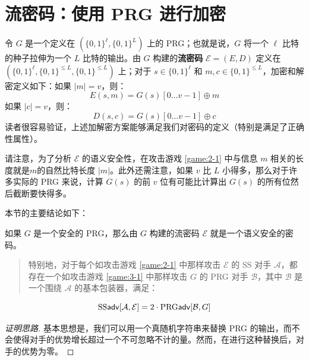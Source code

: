 \section{流密码：使用 PRG 进行加密}\label{sec:3-2}

令 $G$ 是一个定义在 $(\{0,1\}^\ell,\{0,1\}^L)$ 上的 PRG；也就是说，$G$ 将一个 $\ell$ 比特的种子拉伸为一个 $L$ 比特的输出。由 $G$ 构建的\textbf{流密码} $\mathcal E=(E,D)$ 定义在 $(\{0,1\}^\ell,\{0,1\}^{\leq L},\{0,1\}^{\leq L})$ 上；对于 $s\in\{0,1\}^\ell$ 和 $m,c\in\{0,1\}^{\leq L}$，加密和解密定义如下：如果 $|m|=v$，则：
$$
E(s,m)=G(s)[0\dots v-1]\oplus m
$$
如果 $|c| = v$，则：
$$
D(s,c)=G(s)[0\dots v-1]\oplus c
$$
读者很容易验证，上述加解密方案能够满足我们对密码的定义（特别是满足了正确性属性）。

请注意，为了分析 $\mathcal E$ 的语义安全性，在攻击游戏 \ref{game:2-1} 中与信息 $m$ 相关的长度就是$m$的自然比特长度 $|m|$。此外还需注意，如果 $v$ 比 $L$ 小得多，那么对于许多实际的 PRG 来说，计算 $G(s)$ 的前 $v$ 位有可能比计算出 $G(s)$ 的所有位然后截断要快得多。

本节的主要结论如下：

\begin{theorem}\label{theo:3-1}
如果 $G$ 是一个安全的 PRG，那么由 $G$ 构建的流密码 $\mathcal E$ 就是一个语义安全的密码。
\begin{quote}
特别地，对于每个如攻击游戏 \ref{game:2-1} 中那样攻击 $\mathcal E$ 的 SS 对手 $\mathcal A$，都存在一个如攻击游戏 \ref{game:3-1} 中那样攻击 $G$ 的 PRG 对手 $\mathcal B$，其中 $\mathcal B$ 是一个围绕 $\mathcal A$ 的基本包装器，满足：
\end{quote}
\begin{equation}\label{eq:3-2}
{\rm SS\mathsf{adv}}[\mathcal{A},\mathcal{E}]=2\cdot{\rm PRG\mathsf{adv}}[\mathcal{B},G]
\end{equation}
\end{theorem}

\begin{proof}[证明思路]
基本思想是，我们可以用一个真随机字符串来替换 PRG 的输出，而不会使得对手的优势增长超过一个不可忽略不计的量。然而，在进行这种替换后，对手的优势为零。
\end{proof}

